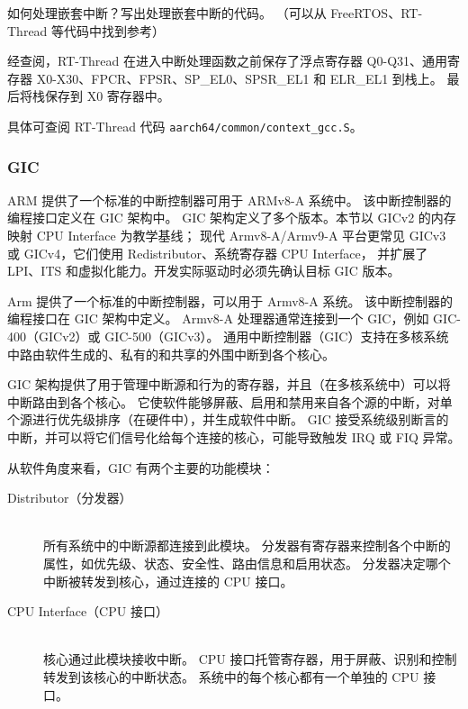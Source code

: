\begin{probsolu}[title={Problem and Solution \theprob}]{
  如何处理嵌套中断？写出处理嵌套中断的代码。
（可以从 FreeRTOS、RT-Thread 等代码中找到参考）
  }\label{pb:how-to-hdl-nest-irqs}

  经查阅，RT-Thread 在进入中断处理函数之前保存了浮点寄存器 Q0-Q31、通用寄存器 X0-X30、FPCR、FPSR、SP\_EL0、SPSR\_EL1 和 ELR\_EL1 到栈上。
  最后将栈保存到 X0 寄存器中。

  具体可查阅 RT-Thread 代码 \lstinline!aarch64/common/context_gcc.S!。
\end{probsolu}

\subsubsection{GIC} \label{sec:gic}

ARM 提供了一个标准的中断控制器可用于 ARMv8-A 系统中。
该中断控制器的编程接口定义在 GIC 架构中。
GIC 架构定义了多个版本。本节以 GICv2 的内存映射 CPU Interface 为教学基线；
现代 Armv8-A/Armv9-A 平台更常见 GICv3 或 GICv4，它们使用 Redistributor、系统寄存器 CPU Interface，
并扩展了 LPI、ITS 和虚拟化能力。开发实际驱动时必须先确认目标 GIC 版本。

Arm 提供了一个标准的中断控制器，可以用于 Armv8-A 系统。
该中断控制器的编程接口在 GIC 架构中定义。
Armv8-A 处理器通常连接到一个 GIC，例如 GIC-400（GICv2）或 GIC-500（GICv3）。
通用中断控制器（GIC）支持在多核系统中路由软件生成的、私有的和共享的外围中断到各个核心。

GIC 架构提供了用于管理中断源和行为的寄存器，并且（在多核系统中）可以将中断路由到各个核心。
它使软件能够屏蔽、启用和禁用来自各个源的中断，对单个源进行优先级排序（在硬件中），并生成软件中断。
GIC 接受系统级别断言的中断，并可以将它们信号化给每个连接的核心，可能导致触发 IRQ 或 FIQ 异常。

从软件角度来看，GIC 有两个主要的功能模块：

\begin{description}
  \item[{Distributor（分发器）}] \hfill \\
    所有系统中的中断源都连接到此模块。
    分发器有寄存器来控制各个中断的属性，如优先级、状态、安全性、路由信息和启用状态。
    分发器决定哪个中断被转发到核心，通过连接的
    CPU 接口。
  \item[{CPU Interface（CPU 接口）}] \hfill \\
    核心通过此模块接收中断。
    CPU 接口托管寄存器，用于屏蔽、识别和控制转发到该核心的中断状态。
    系统中的每个核心都有一个单独的 CPU 接口。
\end{description}

